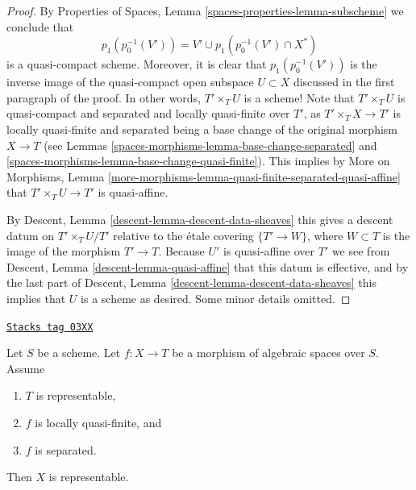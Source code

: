 \begin{proof}
\medskip\noindent
By
Properties of Spaces, Lemma \ref{spaces-properties-lemma-subscheme}
we conclude that
$$
p_1(p_0^{-1}(V')) =
V' \cup p_1(p_0^{-1}(V') \cap X^*)
$$
is a quasi-compact scheme. Moreover, it is clear that
$p_1(p_0^{-1}(V'))$ is the inverse image of the
quasi-compact open subspace $U \subset X$ discussed in the
first paragraph of the proof. In other words, $T' \times_T U$ is a scheme!
Note that $T' \times_T U$ is quasi-compact and
separated and locally quasi-finite over $T'$, as
$T' \times_T X \to T'$ is locally quasi-finite and separated
being a base change of the original morphism $X \to T$ (see
Lemmas \ref{spaces-morphisms-lemma-base-change-separated} and
\ref{spaces-morphisms-lemma-base-change-quasi-finite}).
This implies by
More on Morphisms,
Lemma \ref{more-morphisms-lemma-quasi-finite-separated-quasi-affine}
that $T' \times_T U \to T'$ is quasi-affine.

\medskip\noindent
By
Descent, Lemma \ref{descent-lemma-descent-data-sheaves}
this gives a descent datum on $T' \times_T U / T'$
relative to the \'etale covering $\{T' \to W\}$, where $W \subset T$
is the image of the morphism $T' \to T$.
Because $U'$ is quasi-affine over $T'$ we see from
Descent, Lemma \ref{descent-lemma-quasi-affine}
that this datum is effective, and by the last part of
Descent, Lemma \ref{descent-lemma-descent-data-sheaves}
this implies that $U$ is a scheme as desired.
Some minor details omitted.
\end{proof}

\begin{proposition}
\label{spaces-morphisms-proposition-locally-quasi-finite-separated-over-scheme}
\href{https://stacks.math.columbia.edu/tag/03XX}{\texttt{Stacks tag 03XX}}

Let $S$ be a scheme.
Let $f : X \to T$ be a morphism of algebraic spaces over $S$.
Assume
\begin{enumerate}
\item $T$ is representable,
\item $f$ is locally quasi-finite, and
\item $f$ is separated.
\end{enumerate}
Then $X$ is representable.
\end{proposition}

